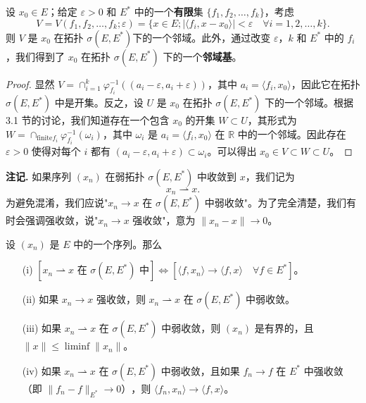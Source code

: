 \begin{proposition}\label{prop3.4}
设 $x_0 \in E$；给定 $\varepsilon > 0$ 和 $E^*$ 中的一个\textbf{有限}集 $\{f_1, f_2, \dots, f_k\}$，考虑
\[
V = V(f_1, f_2, \dots, f_k; \varepsilon) = \{x \in E; |\langle f_i, x - x_0 \rangle| < \varepsilon \quad \forall i = 1, 2, \dots, k\}.
\]
则 $V$ 是 $x_0$ 在拓扑 $\sigma(E, E^*)$下的一个邻域。此外，通过改变 $\varepsilon$，$k$ 和 $E^*$ 中的 $f_i$，我们得到了 $x_0$ 在拓扑 $\sigma(E, E^*)$ 下的一个\textbf{邻域基}。
\end{proposition}

\begin{proof}
显然 $V = \cap_{i=1}^k \varphi_{f_i}^{-1}((a_i - \varepsilon, a_i + \varepsilon))$，其中 $a_i = \langle f_i, x_0 \rangle$，因此它在拓扑 $\sigma(E, E^*)$ 中是开集。反之，设 $U$ 是 $x_0$ 在拓扑 $\sigma(E, E^*)$ 下的一个邻域。根据 3.1 节的讨论，我们知道存在一个包含 $x_0$ 的开集 $W \subset U$，其形式为 $W = \cap_{\text{finite} f_i} \varphi_{f_i}^{-1}(\omega_i)$，其中 $\omega_i$ 是 $a_i = \langle f_i, x_0 \rangle$ 在 $\mathbb{R}$ 中的一个邻域。因此存在 $\varepsilon > 0$ 使得对每个 $i$ 都有 $(a_i - \varepsilon, a_i + \varepsilon) \subset \omega_i$。可以得出 $x_0 \in V \subset W \subset U$。
\end{proof}

\textbf{注记.} 如果序列 $(x_n)$ 在弱拓扑 $\sigma(E, E^*)$ 中收敛到 $x$，我们记为
\[ x_n \rightharpoonup x. \]
为避免混淆，我们应说"$x_n \to x$ 在 $\sigma(E, E^*)$ 中弱收敛"。为了完全清楚，我们有时会强调强收敛，说"$x_n \to x$ 强收敛"，意为 $\|x_n - x\| \to 0$。

\begin{proposition}\label{prop3.5}
设 $(x_n)$ 是 $E$ 中的一个序列。那么
\begin{itemize}
    \item[(i)] $[x_n \rightharpoonup x \text{ 在 } \sigma(E, E^*) \text{ 中}] \iff [\langle f, x_n \rangle \to \langle f, x \rangle \quad \forall f \in E^*]$。
    \item[(ii)] 如果 $x_n \to x$ 强收敛，则 $x_n \rightharpoonup x$ 在 $\sigma(E, E^*)$ 中弱收敛。
    \item[(iii)] 如果 $x_n \rightharpoonup x$ 在 $\sigma(E, E^*)$ 中弱收敛，则 $(x_n)$ 是有界的，且 $\|x\| \le \liminf \|x_n\|$。
    \item[(iv)] 如果 $x_n \rightharpoonup x$ 在 $\sigma(E, E^*)$ 中弱收敛，且如果 $f_n \to f$ 在 $E^*$ 中强收敛（即 $\|f_n - f\|_{E^*} \to 0）$，则 $\langle f_n, x_n \rangle \to \langle f, x \rangle$。
\end{itemize}
\end{proposition}


